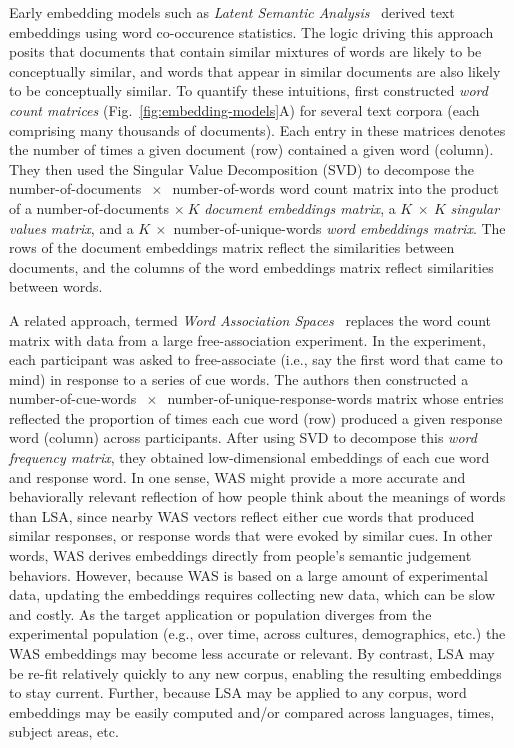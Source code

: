 \documentclass{article}
\begin{document}
Early embedding models such as \textit{Latent Semantic Analysis}~\citep[LSA;][]{DeerEtal90, LandDuma97} derived text embeddings using word co-occurence statistics.  The logic driving this approach posits that documents that contain similar mixtures of words are likely to be conceptually similar, and words that appear in similar documents are also likely to be conceptually similar.  To quantify these intuitions, \cite{DeerEtal90} first constructed \textit{word count matrices} (Fig.~\ref{fig:embedding-models}A) for several text corpora (each comprising many thousands of documents).  Each entry in these matrices denotes the number of times a given document (row) contained a given word (column).  They then used the Singular Value Decomposition (SVD) to decompose the number-of-documents $~\times~$ number-of-words word count matrix into the product of a number-of-documents $\times~K$ \textit{document embeddings matrix}, a $K~\times~K$ \textit{singular values matrix}, and a $K~\times$ number-of-unique-words \textit{word embeddings matrix}.  The rows of the document embeddings matrix reflect the similarities between documents, and the columns of the word embeddings matrix reflect similarities between words.

A related approach, termed \textit{Word Association Spaces}~\citep[WAS;][]{NelsEtal04, SteyEtal04} replaces the word count matrix with data from a large free-association experiment.  In the experiment, each participant was asked to free-associate (i.e., say the first word that came to mind) in response to a series of cue words.  The authors then constructed a number-of-cue-words $~\times~$ number-of-unique-response-words matrix whose entries reflected the proportion of times each cue word (row) produced a given response word (column) across participants.  After using SVD to decompose this \textit{word frequency matrix}, they obtained low-dimensional embeddings of each cue word and response word.  In one sense, WAS might provide a more accurate and behaviorally relevant reflection of how people think about the meanings of words than LSA, since nearby WAS vectors reflect either cue words that produced similar responses, or response words that were evoked by similar cues.  In other words, WAS derives embeddings directly from people's semantic judgement behaviors.  However, because WAS is based on a large amount of experimental data, updating the embeddings requires collecting new data, which can be slow and costly.  As the target application or population diverges from the experimental population (e.g., over time, across cultures, demographics, etc.) the WAS embeddings may become less accurate or relevant.  By contrast, LSA may be re-fit relatively quickly to any new corpus, enabling the resulting embeddings to stay current.  Further, because LSA may be applied to any corpus, word embeddings may be easily computed and/or compared across languages, times, subject areas, etc.
\end{document}
